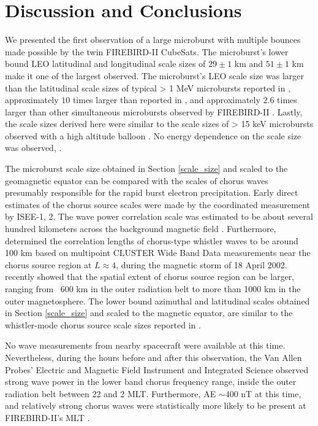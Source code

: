\documentclass[draft, linenumbers]{agujournal}
\begin{document}
\section{Discussion and Conclusions} \label{discussion}
We presented the first observation of a large microburst with multiple bounces made possible by the twin FIREBIRD-II CubeSats. The microburst's lower bound LEO latitudinal and longitudinal scale sizes of $29 \pm 1$ km and $ 51 \pm 1$ km make it one of the largest observed. The microburst's LEO scale size was larger than the latitudinal scale sizes of typical > 1 MeV microbursts reported in \citet{Blake1996}, approximately $10$ times larger than reported in \citet{Dietrich2010}, and approximately $2.6$ times larger than other simultaneous microbursts observed by FIREBIRD-II \citep{Crew2016}. Lastly, the scale sizes derived here were similar to the scale sizes of > 15 keV microbursts observed with a high altitude balloon \citep{Parks1967}. No energy dependence on the  scale size was observed, .

The microburst scale size obtained in Section \ref{scale_size} and scaled to the geomagnetic equator can be compared with the scales of chorus waves presumably responsible for the rapid burst electron precipitation. Early direct estimates of the chorus source scales were made by the coordinated measurement by ISEE-1, 2. The wave power correlation scale was estimated to be about several hundred kilometers across the background magnetic field \citep{Gurnett1979}. Furthermore, \citet{Santolik2003} determined the correlation lengths of chorus-type whistler waves to be around 100 km based on multipoint CLUSTER Wide Band Data measurements near the chorus source region at $L \approx 4$, during the magnetic storm of 18 April 2002. \citet{Agapitov2010, Agapitov2011b, Agapitov2017a} recently showed that the spatial extent of chorus source region can be larger, ranging from ~600 km in the outer radiation belt to more than 1000 km in the outer magnetosphere. The lower bound azimuthal and latitudinal scales obtained in Section \ref{scale_size} and scaled to the magnetic equator, are similar to the whistler-mode chorus source scale sizes reported in \citet{Agapitov2011b, Agapitov2017a}. 

No wave measurements from nearby spacecraft were available at this time. Nevertheless, during the hours before and after this observation, the Van Allen Probes' \citep{Mauk2013} Electric and Magnetic Field Instrument and Integrated Science \citep{Kletzing2013} observed strong wave power in the lower band chorus frequency range, inside the outer radiation belt between 22 and 2 MLT. Furthermore, AE $\sim 400$ nT at this time, and relatively strong chorus waves were statistically more likely to be present at FIREBIRD-II's MLT \citep{Li2009}.
\end{document}
